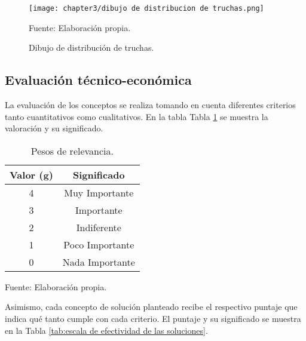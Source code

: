 \begin{figure}[H]
	\centering
	\texttt{[image: chapter3/dibujo de distribucion de truchas.png]}
	\caption{Dibujo de distribución de truchas.}
	\begin{myflushleftportland}
		Fuente: Elaboración propia.
	\end{myflushleftportland}
	\label{fig:dibujo de distribucion de truchas}
\end{figure}

\subsection{Evaluación técnico-económica}

La evaluación de los conceptos se realiza tomando en cuenta diferentes criterios tanto cuantitativos como cualitativos. En la tabla Tabla \ref{tab:pesos de relevancia} se muestra la valoración y su significado.

\begin{table}[H]
	\centering
	\caption{Pesos de relevancia.}
	\label{tab:pesos de relevancia}
	\begin{tabular}{|c|c|}
		\hline
		\rowcolor[HTML]{D9D9D9} 
		\textbf{Valor (g)} & \textbf{Significado} \\ \hline
		4                  & Muy Importante       \\ \hline
		3                  & Importante           \\ \hline
		2                  & Indiferente          \\ \hline
		1                  & Poco Importante      \\ \hline
		0                  & Nada Importante      \\ \hline
	\end{tabular}
	\begin{myflushleftportland}
		Fuente: Elaboración propia.
	\end{myflushleftportland}
\end{table}


Asimismo, cada concepto de solución planteado recibe el respectivo puntaje que indica qué tanto cumple con cada criterio. El puntaje y su significado se muestra en la Tabla \ref{tab:escala de efectividad de las soluciones}.

